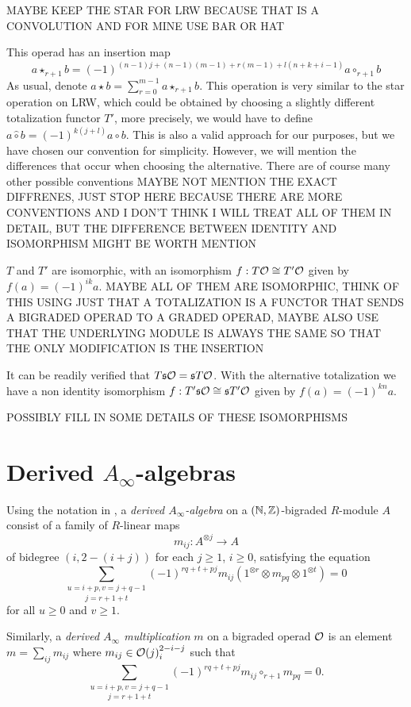 \documentclass[twoside]{article}
\begin{document}
MAYBE KEEP THE STAR FOR LRW BECAUSE THAT IS A CONVOLUTION AND FOR MINE USE BAR OR HAT

This operad has an insertion map
\[a\star_{r+1} b=(-1)^{(n-1)j+(n-1)(m-1)+r(m-1)+l(n+k+i-1)}a\circ_{r+1}b\]
As usual, denote $a\star b=\sum_{r=0}^{m-1}a\star_{r+1}b$. This operation is very similar to the star operation on LRW, which could be obtained by choosing a slightly different totalization functor $T'$, more precisely, we would have to define $a\hat{\circ}b=(-1)^{k(j+l)}a\circ b$. This is also a valid approach for our purposes, but we have chosen our convention for simplicity. However, we will mention the differences that occur when choosing the alternative. There are of course many other possible conventions MAYBE NOT MENTION THE EXACT DIFFRENES, JUST STOP HERE BECAUSE THERE ARE MORE CONVENTIONS AND I DON'T THINK I WILL TREAT ALL OF THEM IN DETAIL, BUT THE DIFFERENCE BETWEEN IDENTITY AND ISOMORPHISM MIGHT BE WORTH MENTION

$T$ and $T'$ are isomorphic, with an isomorphism $f:T{\mathcal O}\cong T'{\mathcal O}$ given by $f(a)=(-1)^{ik}a$. MAYBE ALL OF THEM ARE ISOMORPHIC, THINK OF THIS USING JUST THAT A TOTALIZATION IS A FUNCTOR THAT SENDS A BIGRADED OPERAD TO A GRADED OPERAD, MAYBE ALSO USE THAT THE UNDERLYING MODULE IS ALWAYS THE SAME SO THAT THE ONLY MODIFICATION IS THE INSERTION

It can be readily verified that $T\mathfrak{s}{\mathcal O}=\mathfrak{s} T{\mathcal O}$. With the alternative totalization we have a non identity isomorphism $f:T'\mathfrak{s}{\mathcal O}\cong\mathfrak{s} T'{\mathcal O}$ given by $f(a)=(-1)^{kn}a$.

POSSIBLY FILL IN SOME DETAILS OF THESE ISOMORPHISMS
\section{Derived $A_\infty$-algebras}
Using the notation in \cite{RW}, a \emph{derived $A_\infty$-algebra} on a $(\mathbb{N},\mathbb{Z})$-bigraded $R$-module $A$ consist of a family of $R$-linear maps 
\[m_{ij}:A^{\otimes j}\to A\]
of bidegree $(i,2-(i+j))$ for each $j\geq 1$, $i\geq 0$, satisfying the equation
\[\underset{j=r+1+t}{\sum_{u=i+p, v=j+q-1}}(-1)^{rq+t+pj}m_{ij}(1^{\otimes r}\otimes m_{pq}\otimes 1^{\otimes t})=0\]
for all $u\geq 0$ and $v\geq 1$. 


Similarly, a \emph{derived $A_\infty$ multiplication} $m$ on a bigraded operad ${\mathcal O}$ is an element $m=\sum_{ij}m_{ij}$ where $m_{ij}\in{\mathcal O}(j)^{2-i-j}_i$ such that 
\[\underset{j=r+1+t}{\sum_{u=i+p, v=j+q-1}}(-1)^{rq+t+pj}m_{ij}\circ_{r+1} m_{pq}=0.\]
\end{document}
